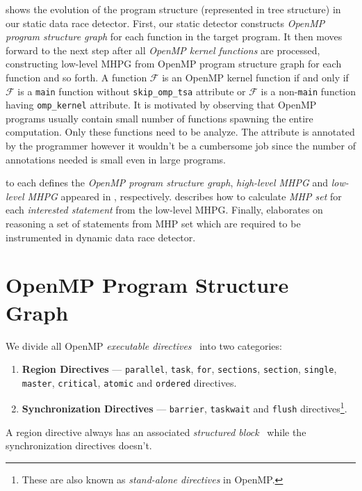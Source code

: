  shows the evolution of the program structure (represented in tree structure) in our static data race detector. First, our static detector constructs \textit{OpenMP program structure graph} for each function in the target program. It then moves forward to the next step after all \textit{OpenMP kernel functions} are processed, constructing low-level MHPG from OpenMP program structure graph for each function and so forth. A function $\mathcal{F}$ is an OpenMP kernel function if and only if $\mathcal{F}$ is a \texttt{main} function without \texttt{skip\_omp\_tsa} attribute or $\mathcal{F}$ is a non-\texttt{main} function having \texttt{omp\_kernel} attribute. It is motivated by observing that OpenMP programs usually contain small number of functions spawning the entire computation. Only these functions need to be analyze. The attribute is annotated by the programmer however it wouldn't be a cumbersome job since the number of annotations needed is small even in large programs.

 to  each defines the \textit{OpenMP program structure graph}, \textit{high-level MHPG} and \textit{low-level MHPG} appeared in , respectively.  describes how to calculate \textit{MHP set} for each \textit{interested statement} from the low-level MHPG. Finally,  elaborates on reasoning a set of statements from MHP set which are required to be instrumented in dynamic data race detector.

\section{OpenMP Program Structure Graph}
\label{s:OpenMP-Program-Structure-Graph}

We divide all OpenMP \textit{executable directives}~\cite{OpenMP30Spec} into two categories:
\begin{enumerate}
	\item \textbf{Region Directives} --- \texttt{parallel}, \texttt{task}, \texttt{for}, \texttt{sections}, \texttt{section}, \texttt{single}, \texttt{master}, \texttt{critical}, \texttt{atomic} and \texttt{ordered} directives.
	\item \textbf{Synchronization Directives} --- \texttt{barrier}, \texttt{taskwait} and \texttt{flush} directives\footnote{These are also known as \textit{stand-alone directives} in OpenMP.}.
\end{enumerate}
A region directive always has an associated \textit{structured block}~\cite{OpenMP30Spec} while the synchronization directives doesn't.

